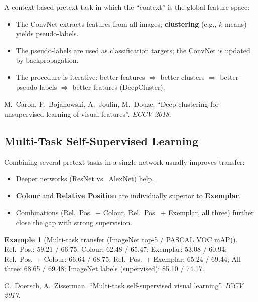 \documentclass[11pt,a4paper]{article}
\theoremstyle{definition}
\newtheorem{example}{Example}[section]
\theoremstyle{plain}
\theoremstyle{remark}
\begin{document}
A context-based pretext task in which the ``context'' is the global feature space:

\begin{itemize}
    \item The ConvNet extracts features from all images; \textbf{clustering} (e.g., $k$-means) yields pseudo-labels.
    \item The pseudo-labels are used as classification targets; the ConvNet is updated by backpropagation.
    \item The procedure is iterative: better features $\Rightarrow$ better clusters $\Rightarrow$ better pseudo-labels $\Rightarrow$ better features (DeepCluster).
\end{itemize}

\begin{tcolorbox}[colback=blue!5!white,colframe=blue!60!black,title={Reference}]
M.\ Caron, P.\ Bojanowski, A.\ Joulin, M.\ Douze. ``Deep clustering for unsupervised learning of visual features''. \textit{ECCV 2018}.
\end{tcolorbox}

\subsection{Multi-Task Self-Supervised Learning}

Combining several pretext tasks in a single network usually improves transfer:

\begin{itemize}
    \item Deeper networks (ResNet vs.\ AlexNet) help.
    \item \textbf{Colour} and \textbf{Relative Position} are individually superior to \textbf{Exemplar}.
    \item Combinations (Rel.\ Pos.\ + Colour, Rel.\ Pos.\ + Exemplar, all three) further close the gap with strong supervision.
\end{itemize}

\begin{example}[Multi-task transfer (ImageNet top-5 / PASCAL VOC mAP)]
Rel.\ Pos.: 59.21 / 66.75; Colour: 62.48 / 65.47; Exemplar: 53.08 / 60.94; Rel.\ Pos.\ + Colour: 66.64 / 68.75; Rel.\ Pos.\ + Exemplar: 65.24 / 69.44; All three: 68.65 / 69.48; ImageNet labels (supervised): 85.10 / 74.17.
\end{example}

\begin{tcolorbox}[colback=blue!5!white,colframe=blue!60!black,title={Reference}]
C.\ Doersch, A.\ Zisserman. ``Multi-task self-supervised visual learning''. \textit{ICCV 2017}.
\end{tcolorbox}
\end{document}
